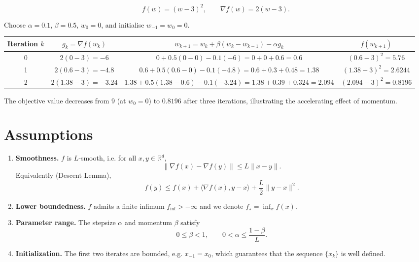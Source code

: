 \documentclass{article}
\begin{document}
\[
f(w)=(w-3)^{2},\qquad \nabla f(w)=2(w-3).
\]

Choose $\alpha=0.1$, $\beta=0.5$, $w_{0}=0$, and initialise $w_{-1}=w_{0}=0$.

\begin{center}
\begin{tabular}{c|c|c|c}
Iteration $k$ & $g_{k}= \nabla f(w_{k})$ & $w_{k+1}=w_{k}+\beta(w_{k}-w_{k-1})-\alpha g_{k}$ & $f(w_{k+1})$\\\hline
0 & $2(0-3)=-6$ & $0+0.5(0-0)-0.1(-6)=0+0+0.6=0.6$ & $(0.6-3)^{2}=5.76$\\
1 & $2(0.6-3)=-4.8$ & $0.6+0.5(0.6-0)-0.1(-4.8)=0.6+0.3+0.48=1.38$ & $(1.38-3)^{2}=2.6244$\\
2 & $2(1.38-3)=-3.24$ & $1.38+0.5(1.38-0.6)-0.1(-3.24)=1.38+0.39+0.324=2.094$ & $(2.094-3)^{2}=0.8196$
\end{tabular}
\end{center}

The objective value decreases from $9$ (at $w_{0}=0$) to $0.8196$ after three iterations, illustrating the accelerating effect of momentum.

\newpage

\section*{Assumptions}

\begin{enumerate}[label={\bf A\arabic*}.]
\item \label{A1} \textbf{Smoothness.} $f$ is $L$‑smooth, i.e. for all $x,y\in\mathbb{R}^{d}$,
\[
\|\nabla f(x)-\nabla f(y)\|\le L\|x-y\|.
\tag{A1}
\]
Equivalently (Descent Lemma),
\[
f(y)\le f(x)+\langle\nabla f(x),y-x\rangle+\frac{L}{2}\|y-x\|^{2}.
\tag{A1$'$}
\]

\item \label{A2} \textbf{Lower boundedness.} $f$ admits a finite infimum $f_{\inf}>-\infty$ and we denote $f_{\star}= \inf_{x}f(x)$.

\item \label{A3} \textbf{Parameter range.} The stepsize $\alpha$ and momentum $\beta$ satisfy
\[
0\le \beta<1,\qquad 0<\alpha\le\frac{1-\beta}{L}.
\tag{A3}
\]

\item \label{A4} \textbf{Initialization.} The first two iterates are bounded, e.g. $x_{-1}=x_{0}$, which guarantees that the sequence $\{x_{k}\}$ is well defined.
\end{enumerate}
\end{document}
